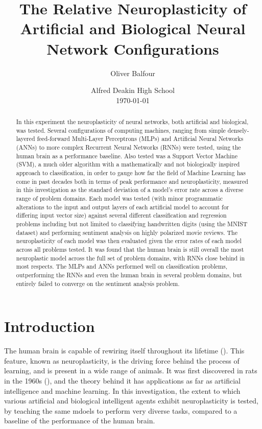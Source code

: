 \documentclass[]{report}
\title{
	The Relative Neuroplasticity of Artificial
	\linebreak
	and Biological Neural Network Configurations
}
\author{Oliver Balfour}
\date{%
	Alfred Deakin High School\\[2ex]%
	\today
}
\begin{document}
\maketitle

\begin{abstract}
	In this experiment the neuroplasticity of neural networks, both artificial and biological, was tested. Several configurations of computing machines, ranging from simple densely-layered feed-forward Multi-Layer Perceptrons (MLPs) and Artificial Neural Networks (ANNs) to more complex Recurrent Neural Networks (RNNs) were tested, using the human brain as a performance baseline. Also tested was a Support Vector Machine (SVM), a much older algorithm with a mathematically and not biologically inspired approach to classification, in order to gauge how far the field of Machine Learning has come in past decades both in terms of peak performance and neuroplasticity, measured in this investigation as the standard deviation of a model's error rate across a diverse range of problem domains. Each model was tested (with minor programmatic alterations to the input and output layers of each artificial model to account for differing input vector size) against several different classification and regression problems including but not limited to classifying handwritten digits (using the MNIST dataset) and performing sentiment analysis on highly polarized movie reviews. The neuroplasticity of each model was then evaluated given the error rates of each model across all problems tested. It was found that the human brain is still overall the most neuroplastic model across the full set of problem domains, with RNNs close behind in most respects. The MLPs and ANNs performed well on classification problems, outperforming the RNNs and even the human brain in several problem domains, but entirely failed to converge on the sentiment analysis problem.
\end{abstract}

\tableofcontents
\newpage

\section{Introduction}

The human brain is capable of rewiring itself throughout its lifetime (\cite{draganski2004neuroplasticity}). This feature, known as neuroplasticity, is the driving force behind the process of learning, and is present in a wide range of animals. It was first discovered in rats in the 1960s (\cite{bennett1964chemical}), and the theory behind it has applications as far as artificial intelligence and machine learning. In this investigation, the extent to which various artificial and biological intelligent agents exhibit neuroplasticity is tested, by teaching the same mdoels to perform very diverse tasks, compared to a baseline of the performance of the human brain.
\end{document}
